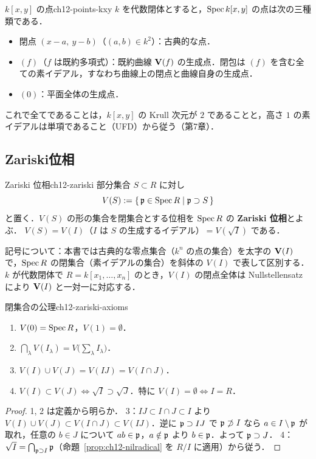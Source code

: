 \begin{myex}{$k[x,y]$ の点}{ch12-points-kxy}
$k$ を代数閉体とすると，$\operatorname{Spec} k[x,y]$ の点は次の三種類である．
\begin{itemize}
  \item 閉点 $(x-a,\ y-b)$（$(a,b)\in k^2$）：古典的な点．
  \item $(f)$（$f$ は既約多項式）：既約曲線 $\mathbf{V}(f)$ の生成点．閉包は $(f)$ を含む全ての素イデアル，すなわち曲線上の閉点と曲線自身の生成点．
  \item $(0)$：平面全体の生成点．
\end{itemize}
これで全てであることは，$k[x,y]$ の Krull 次元が $2$ であることと，高さ $1$ の素イデアルは単項であること（UFD）から従う（第7章）．
\end{myex}

\subsection{Zariski位相}

\begin{mydef}{Zariski 位相}{ch12-zariski}
部分集合 $S\subset R$ に対し
\[
  V(S) := \{\,\mathfrak{p}\in\operatorname{Spec} R\mid \mathfrak{p}\supset S\,\}
\]
と置く．$V(S)$ の形の集合を閉集合とする位相を $\operatorname{Spec} R$ の \textbf{Zariski 位相}とよぶ．
$V(S)=V(I)$（$I$ は $S$ の生成するイデアル）$=V(\sqrt{I})$ である．
\end{mydef}

\begin{note}
記号について：本書では古典的な零点集合（$k^n$ の点の集合）を太字の $\mathbf{V}(I)$ で，$\operatorname{Spec} R$ の閉集合（素イデアルの集合）を斜体の $V(I)$ で表して区別する．
$k$ が代数閉体で $R=k[x_1,\dots,x_n]$ のとき，$V(I)$ の閉点全体は Nullstellensatz により $\mathbf{V}(I)$ と一対一に対応する．
\end{note}

\begin{myprop}{閉集合の公理}{ch12-zariski-axioms}
\begin{enumerate}
  \item $V(0)=\operatorname{Spec} R$，$V(1)=\emptyset$．
  \item $\bigcap_\lambda V(I_\lambda) = V\big(\sum_\lambda I_\lambda\big)$．
  \item $V(I)\cup V(J)=V(IJ)=V(I\cap J)$．
  \item $V(I)\subset V(J)\iff \sqrt{I}\supset\sqrt{J}$．特に $V(I)=\emptyset\iff I=R$．
\end{enumerate}
\end{myprop}
\begin{proof}
1, 2 は定義から明らか．
3：$IJ\subset I\cap J\subset I$ より $V(I)\cup V(J)\subset V(I\cap J)\subset V(IJ)$．逆に $\mathfrak{p}\supset IJ$ で $\mathfrak{p}\not\supset I$ なら $a\in I\setminus\mathfrak{p}$ が取れ，任意の $b\in J$ について $ab\in\mathfrak{p}$，$a\notin\mathfrak{p}$ より $b\in\mathfrak{p}$．よって $\mathfrak{p}\supset J$．
4：$\sqrt I=\bigcap_{\mathfrak{p}\supset I}\mathfrak{p}$（命題~\ref{prop:ch12-nilradical} を $R/I$ に適用）から従う．
\end{proof}


